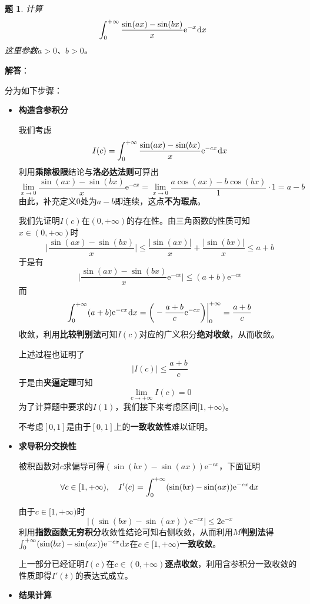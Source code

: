 \documentclass[a4paper,UTF8,fontset=windows,AutoFakeBold]{ctexart}
\newcommand*{\dr}{\hspace{0.07em}\mathrm{d}}
\newcommand*{\er}{\mathrm{e}}
\newcommand*{\note}{\noindent *}
\theoremstyle{ex}
\newtheorem{exercise}{题}
\newcommand{\sol}[1]{{\vspace{5pt}\kaishu\noindent\textbf{解答}：\vspace{-3pt}
\begin{compactitem}
    \item[] #1
\end{compactitem}
}}
\begin{document}
\begin{framed}
\begin{exercise}
    计算
    $$\int_0^{+\infty}\frac{\sin(ax)-\sin(bx)}{x}\er^{-x}\dr x$$
    这里参数$a>0$、$b>0$。
\end{exercise}
\sol{
    分为如下步骤：
    \begin{itemize}
        \item \textbf{构造含参积分}
        
        我们考虑
        $$I(c)=\int_0^{+\infty}\frac{\sin(ax)-\sin(bx)}{x}\er^{-cx}\dr x$$
        利用\textbf{乘除极限}结论与\textbf{洛必达法则}可算出
        $$\lim_{x\to0}\frac{\sin(ax)-\sin(bx)}{x}\er^{-cx}=\lim_{x\to0}\frac{a\cos(ax)-b\cos(bx)}{1}\cdot1=a-b$$
        由此，补充定义0处为$a-b$即连续，这点\textbf{不为瑕点}。

        我们先证明$I(c)$在$(0,+\infty)$的存在性。由三角函数的性质可知$x\in(0,+\infty)$时
        $$\bigg|\frac{\sin(ax)-\sin(bx)}{x}\bigg|\le\frac{|\sin(ax)|}{x}+\frac{|\sin(bx)|}{x}\le a+b$$
        于是有
        $$\bigg|\frac{\sin(ax)-\sin(bx)}{x}\er^{-cx}\bigg|\le(a+b)\er^{-cx}$$
        而
        $$\int_0^{+\infty}(a+b)\er^{-cx}\dr x=\bigg(-\frac{a+b}{c}\er^{-cx}\bigg)\bigg|^{+\infty}_0=\frac{a+b}{c}$$
        收敛，利用\textbf{比较判别法}可知$I(c)$对应的广义积分\textbf{绝对收敛}，从而收敛。

        上述过程也证明了
        $$|I(c)|\le\frac{a+b}{c}$$
        于是由\textbf{夹逼定理}可知
        $$\lim_{c\to+\infty}I(c)=0$$
        为了计算题中要求的$I(1)$，我们接下来考虑区间$[1,+\infty)$。

        \note 不考虑$[0,1]$是由于$[0,1]$上的\textbf{一致收敛性}难以证明。

        \item \textbf{求导积分交换性}
        
        被积函数对$c$求偏导可得$(\sin(bx)-\sin(ax))\er^{-cx}$，下面证明
        $$\forall c\in[1,+\infty),\quad I'(c)=\int_0^{+\infty}(\sin(bx)-\sin(ax))\er^{-cx}\dr x$$

        由于$c\in[1,+\infty)$时
        $$|(\sin(bx)-\sin(ax))\er^{-cx}|\le2\er^{-x}$$
        利用\textbf{指数函数无穷积分}收敛性结论可知右侧收敛，从而利用\textbf{$M$判别法}得$\int_0^{+\infty}(\sin(bx)-\sin(ax))\er^{-cx}\dr x$在$c\in[1,+\infty)$\textbf{一致收敛}。

        上一部分已经证明$I(c)$在$c\in(0,+\infty)$\textbf{逐点收敛}，利用含参积分一致收敛的性质即得$I'(t)$的表达式成立。
            
        \item \textbf{结果计算}
        

\end{itemize}}
\end{framed}
\end{document}
